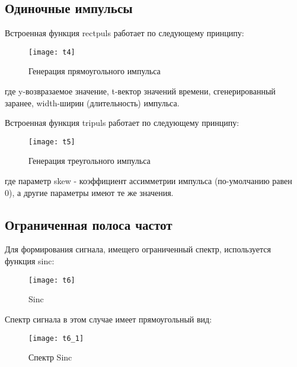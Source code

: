\subsection{Одиночные импульсы}
Встроенная функция rectpuls работает по следующему принципу:
\begin{figure}[H]
	\begin{center}
		\texttt{[image: t4]}
		\caption{Генерация прямоугольного импульса} 
		\label{pic:t4} %
	\end{center}
\end{figure}
где y-возвразаемое значение, t-вектор значений времени, сгенерированный заранее, width-ширин (длительность) импульса.

Встроенная функция tripuls работает по следующему принципу:
\begin{figure}[H]
	\begin{center}
		\texttt{[image: t5]}
		\caption{Генерация треугольного импульса} 
		\label{pic:t5} %
	\end{center}
\end{figure}
где параметр skew - коэффициент ассимметрии импульса (по-умолчанию равен 0), а другие параметры имеют те же значения.

\subsection{Ограниченная полоса частот}
Для формирования сигнала, имещего ограниченный спектр, используется функция sinc:
\begin{figure}[H]
	\begin{center}
		\texttt{[image: t6]}
		\caption{Sinc} 
		\label{pic:t6} %
	\end{center}
\end{figure}
Спектр сигнала в этом случае имеет прямоугольный вид:
\begin{figure}[H]
	\begin{center}
		\texttt{[image: t6\_1]}
		\caption{Спектр Sinc} 
		\label{pic:t6_1} %
	\end{center}
\end{figure}

